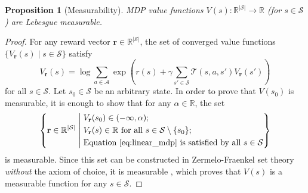 \documentclass{mpaper}
\newtheorem{proposition}[theorem]{Proposition}
\newcommand{\V}{V_{\mathbf{r}}}
\begin{document}
\begin{proposition}[Measurability] \label{thm:measurability}
  MDP value functions $V(s) \colon \mathbb{R}^{|\mathcal{S}|} \to \mathbb{R}$
  (for $s \in \mathcal{S}$) are Lebesgue measurable.
\end{proposition}
\begin{proof}
  For any reward vector $\mathbf{r} \in \mathbb{R}^{|\mathcal{S}|}$, the
  set of converged value functions $\{ \V(s) \mid s \in
  \mathcal{S} \}$ satisfy
  \begin{equation} \label{eq:linear_mdp}
    \V(s) = \log \sum_{a \in \mathcal{A}}
    \exp\left( r(s) + \gamma\sum_{s' \in \mathcal{S}} \mathcal{T}(s, a,
      s')\V(s') \right)
  \end{equation}
  for all $s \in \mathcal{S}$. Let $s_0 \in \mathcal{S}$ be an arbitrary state.
  In order to prove that $V(s_0)$ is measurable, it is enough to show that for
  any $\alpha \in \mathbb{R}$, the set
  \[
    \left\{ \mathbf{r} \in \mathbb{R}^{|\mathcal{S}|} \; \middle|
    \begin{aligned}
      \;&\V(s_0) \in (-\infty, \alpha); \\
      \;&\V(s) \in \mathbb{R} \text{ for all } s \in \mathcal{S} \setminus \{ s_0 \}; \\
      \;&\text{Equation~\eqref{eq:linear_mdp} is satisfied by all } s \in
      \mathcal{S}
    \end{aligned}
    \right\}
  \]
  is measurable. Since this set can be constructed in Zermelo-Fraenkel set
  theory \emph{without} the axiom of choice, it is measurable
  \cite{herrlich2006axiom}, which proves that $V(s)$ is a measurable function
  for any $s \in \mathcal{S}$.
\end{proof}
\end{document}
